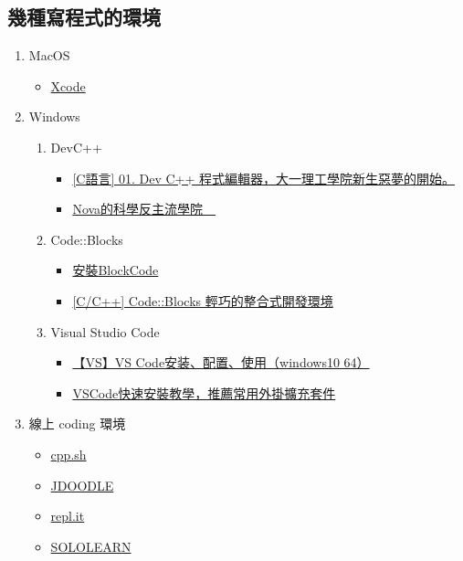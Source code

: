 \documentclass[a4paper,12pt]{article}
\begin{document}
\subsection{幾種寫程式的環境}
\label{sec:orgd99603b}
\begin{enumerate}
\item MacOS
\label{sec:org5c7acfd}
\begin{itemize}
\item \href{https://developer.apple.com/xcode/}{Xcode}\\
\end{itemize}
\item Windows
\label{sec:org9847af4}
\begin{enumerate}
\item DevC++
\label{sec:orgaf27806}
\begin{itemize}
\item \href{https://progressbar.tw/posts/7}{[C語言] 01. Dev C++ 程式編輯器，大一理工學院新生惡夢的開始。}\\
\item \href{http://selfinquiring.hatenablog.com/entry/2016/03/18/204352}{Nova的科學反主流學院　}\\
\end{itemize}
\item Code::Blocks
\label{sec:orga273dfa}
\begin{itemize}
\item \href{https://blog.csdn.net/DongChengRong/article/details/78624068}{安裝BlockCode}\\
\item \href{https://mks.tw/1053/cc-codeblocks-\%E8\%BC\%95\%E5\%B7\%A7\%E7\%9A\%84\%E6\%95\%B4\%E5\%90\%88\%E5\%BC\%8F\%E9\%96\%8B\%E7\%99\%BC\%E7\%92\%B0\%E5\%A2\%83}{[C/C++] Code::Blocks 輕巧的整合式開發環境}\\
\end{itemize}
\item Visual Studio Code
\label{sec:orgd99dfeb}
\begin{itemize}
\item \href{https://blog.csdn.net/HelloZEX/article/details/84029810}{【VS】VS Code安装、配置、使用（windows10 64）}\\
\item \href{https://tw.alphacamp.co/blog/visual-studio-code-editor-tutorial-and-extensions}{VSCode快速安裝教學，推薦常用外掛擴充套件}\\
\end{itemize}
\end{enumerate}
\item 線上 coding 環境
\label{sec:org7e1540d}
\begin{itemize}
\item \href{http://cpp.sh/}{cpp.sh}\\
\item \href{https://www.jdoodle.com/online-compiler-c++/}{JDOODLE}\\
\item \href{https://repl.it/languages/cpp}{repl.it}\\
\item \href{https://code.sololearn.com/\#cpp}{SOLOLEARN}\\
\end{itemize}


\end{enumerate}
\end{document}
